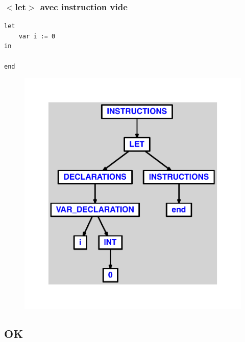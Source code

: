 \documentclass{article}
\begin{document}
\subsubsection{$ < $let$ > $ avec instruction vide}
\begin{lstlisting}
let
	var i := 0
in

end
\end{lstlisting}
\newpage
\begin{figure}[H]
\centering
\includegraphics[max width=\textwidth]{ast/ast_271.pdf}
\end{figure}
\newpage
\subsection{OK}
\end{document}
